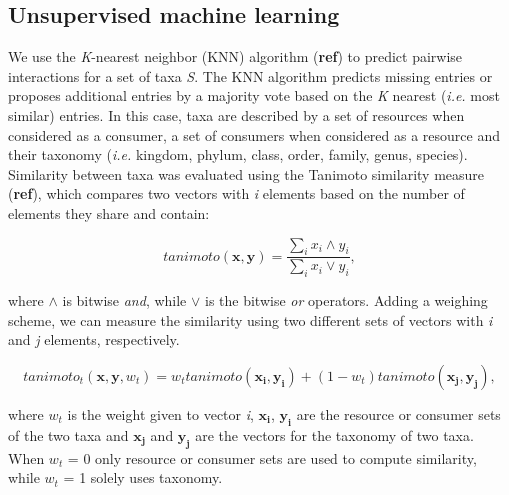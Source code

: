 \documentclass[letterpaper]{article}
\begin{document}
  \subsection{Unsupervised machine learning}
We use the \textit{K}-nearest neighbor (KNN) algorithm (\textbf{ref}) to predict pairwise interactions for a set of taxa \textit{S}. The KNN algorithm predicts missing entries or proposes additional entries by a majority vote based on the \textit{K} nearest (\textit{i.e.} most similar) entries. In this case, taxa are described by a set of resources when considered as a consumer, a set of consumers when considered as a resource and their taxonomy (\textit{i.e.} kingdom, phylum, class, order, family, genus, species). Similarity between taxa was evaluated using the Tanimoto similarity measure (\textbf{ref}), which compares two vectors with \textit{i} elements based on the number of elements they share and contain:

\begin{equation}
  tanimoto(\mathbf{x}, \mathbf{y}) = \frac{\sum_i x_i \land y_i}{\sum_i x_i \lor y_i},
\end{equation}

where $\land$ is bitwise \emph{and}, while $\lor$ is the bitwise \emph{or} operators. Adding a weighing scheme, we can measure the similarity using two different sets of vectors with \textit{i} and \textit{j} elements, respectively.

\begin{equation}
  tanimoto_t(\mathbf{x}, \mathbf{y}, w_t) = w_ttanimoto(\mathbf{x_i}, \mathbf{y_i}) + (1 - w_t)tanimoto(\mathbf{x_j}, \mathbf{y_j}),
\end{equation}

where $w_t$ is the weight given to vector \textit{i}, $\mathbf{x_i}$, $\mathbf{y_i}$ are the resource or consumer sets of the two taxa and $\mathbf{x_j}$ and $\mathbf{y_j}$ are the vectors for the taxonomy of two taxa. When $w_t$ = 0 only resource or consumer sets are used to compute similarity, while $w_t$ = 1 solely uses taxonomy.
\end{document}
